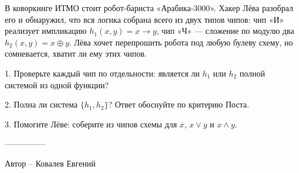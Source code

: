 \question
В коворкинге ИТМО стоит робот-бариста «Арабика-3000». Хакер Лёва разобрал его и обнаружил, что вся логика собрана всего из двух типов чипов: чип «И» реализует импликацию $h_1(x, y) = x \to y$, чип «Ч» — сложение по модулю два $h_2(x, y) = x \oplus y$. Лёва хочет перепрошить робота под любую булеву схему, но сомневается, хватит ли ему этих чипов.

1. Проверьте каждый чип по отдельности: является ли $h_1$ или $h_2$ полной системой из одной функции?

2. Полна ли система $\{h_1, h_2\}$? Ответ обоснуйте по критерию Поста.

3. Помогите Лёве: соберите из чипов схемы для $\overline{x}$, $x \lor y$ и $x \land y$.

---------------

Автор -- Ковалев Евгений